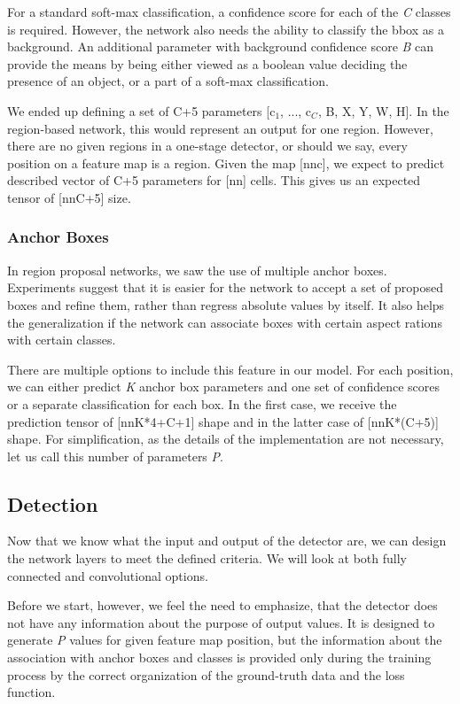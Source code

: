 For a standard soft-max classification, a confidence score for each of the \textit{C} classes is required. However, the network also needs the ability to classify the bbox as a background. An additional parameter with background confidence score \textit{B} can provide the means by being either viewed as a boolean value deciding the presence of an object, or a part of a soft-max classification.

We ended up defining a set of C+5 parameters [c$_1$, ..., c$_C$, B, X, Y, W, H]. In the region-based network, this would represent an output for one region. However, there are no given regions in a one-stage detector, or should we say, every position on a feature map is a region. Given the map [n\x n\x c], we expect to predict described vector of C+5 parameters for [n\x n] cells. This gives us an expected tensor of [n\x n\x C+5] size. 

\subsubsection{Anchor Boxes}
In region proposal networks, we saw the use of multiple anchor boxes. Experiments suggest that it is easier for the network to accept a set of proposed boxes and refine them, rather than regress absolute values by itself. It also helps the generalization if the network can associate boxes with certain aspect rations with certain classes.

There are multiple options to include this feature in our model. For each position, we can either predict \textit{K} anchor box parameters and one set of confidence scores or a separate classification for each box. In the first case, we receive the prediction tensor of [n\x n\x K*4+C+1] shape and in the latter case of [n\x n\x K*(C+5)] shape. For simplification, as the details of the implementation are not necessary, let us call this number of parameters \textit{P}.

\subsection*{Detection}
Now that we know what the input and output of the detector are, we can design the network layers to meet the defined criteria. We will look at both fully connected and convolutional options.

Before we start, however, we feel the need to emphasize, that the detector does not have any information about the purpose of output values. It is designed to generate \textit{P} values for given feature map position, but the information about the association with anchor boxes and classes is provided only during the training process by the correct organization of the ground-truth data and the loss function.

